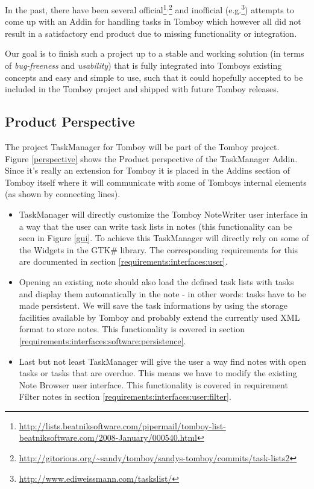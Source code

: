 
\label{integration}
In the past, there have been several official\footnote{\url{http://lists.beatniksoftware.com/pipermail/tomboy-list-beatniksoftware.com/2008-January/000540.html}}$^,$\footnote{\url{http://gitorious.org/~sandy/tomboy/sandys-tomboy/commits/task-lists2}} and inofficial (e.g.\footnote{\url{http://www.ediweissmann.com/taskslist/}}) attempts to come up with an Addin for handling tasks in Tomboy which however all did not result in a satisfactory end product due to missing functionality or integration.

Our goal is to finish such a project up to a stable and working solution (in terms of \textit{bug-freeness} and \textit{usability}) that is fully integrated into Tomboys existing concepts and easy and simple to use, such that it could hopefully accepted to be included in the Tomboy project and shipped with future Tomboy releases.

\subsection{Product Perspective}
\label{description:perspective}
  The project TaskManager for Tomboy will be part of the Tomboy project.\\
  Figure \ref{perspective} shows the Product perspective of the TaskManager Addin. Since it's really an extension for Tomboy it is placed in
  the Addins section of Tomboy itself where it will communicate with some of Tomboys internal elements (as shown by connecting lines).
  \begin{itemize}
    \item TaskManager will directly customize the Tomboy NoteWriter user interface in a way that the user can write task lists in notes 
	(this functionality can be seen in Figure \ref{gui}. To achieve this TaskManager will  directly rely on some of the 
	Widgets in the GTK\# library. The corresponding requirements for this are documented in section \ref{requirements:interfaces:user}.
    \item Opening an existing note should also load the defined task lists with tasks and display them automatically in the note - in other words:
    tasks have to be made persistent.
	We  will save the task informations by using the storage facilities available by Tomboy and probably extend
    the currently used XML format to store notes. This functionality is covered in section \ref{requirements:interfaces:software:persistence}.
    \item Last but not least TaskManager will give the user a way find notes with open tasks or tasks that are overdue. This means we have to modify
    the existing Note Browser user interface. This functionality is covered in requirement Filter notes in section \ref{requirements:interfaces:user:filter}.
  \end{itemize}


